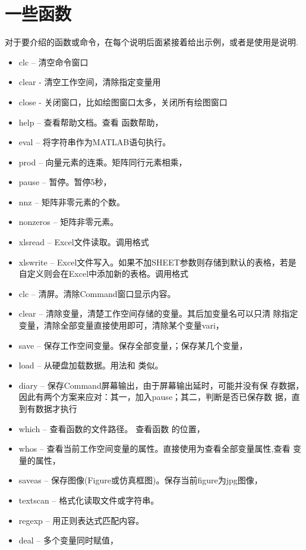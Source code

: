 \section{一些函数}

对于要介绍的函数或命令，在每个说明后面紧接着给出示例，或者是使用是说明.

\begin{itemize}
  \item{clc} -- 清空命令窗口
  \item{clear} - 清空工作空间，清除指定变量用 
  \item{close} - 关闭窗口，比如绘图窗口太多，关闭所有绘图窗口 
  \item{help} -- 查看帮助文档。查看  函数帮助，
  \item{eval} -- 将字符串作为MATLAB语句执行。
  \item{prod} -- 向量元素的连乘。矩阵同行元素相乘，
  \item{pause} -- 暂停。暂停5秒，
  \item{nnz} -- 矩阵非零元素的个数。
  \item{nonzeros} -- 矩阵非零元素。
  \item{xlsread} -- Excel文件读取。调用格式 
  \item{xlswrite} -- Excel文件写入。如果不加SHEET参数则存储到默认的表格，若是自定义则会在Excel中添加新的表格。调用格式 
  \item{clc} -- 清屏。清除Command窗口显示内容。
  \item{clear} -- 清除变量，清楚工作空间存储的变量。其后加变量名可以只清
  除指定变量，清除全部变量直接使用即可，清除某个变量vari，
  \item{save} -- 保存工作空间变量。保存全部变量，；保存某几个变量，\\ 
  \item{load} -- 从硬盘加载数据。用法和  类似。
  \item{diary} -- 保存Command屏幕输出，由于屏幕输出延时，可能并没有保
  存数据，因此有两个方案来应对：其一，加入pause；其二，判断是否已保存数
  据，直到有数据才执行 
  \item{which} -- 查看函数的文件路径。 查看函数  的位置，
  \item{whos} -- 查看当前工作空间变量的属性。直接使用为查看全部变量属性,查看  变量的属性，
  \item{saveas} -- 保存图像(Figure或仿真框图)。保存当前figure为jpg图像，\\ 
  \item{textscan} -- 格式化读取文件或字符串。
  \item{regexp} -- 用正则表达式匹配内容。
  \item{deal} -- 多个变量同时赋值，
\end{itemize}